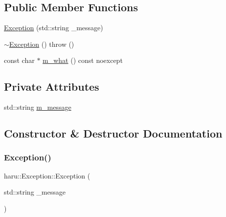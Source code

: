 \subsection*{Public Member Functions}
\begin{DoxyCompactItemize}
\item 
\mbox{\hyperlink{classharu_1_1_exception_a0bbb05d0c389c35b2917265a4d0fedfd}{Exception}} (std\+::string \+\_\+message)
\item 
\mbox{\hyperlink{classharu_1_1_exception_afcd6237b3d29ea8706f041a8d8f10ac9}{$\sim$\+Exception}} ()  throw ()
\item 
const char $\ast$ \mbox{\hyperlink{classharu_1_1_exception_a2b579cd90e5fcbf2894b903c3915550b}{m\+\_\+what}} () const noexcept
\end{DoxyCompactItemize}
\subsection*{Private Attributes}
\begin{DoxyCompactItemize}
\item 
std\+::string \mbox{\hyperlink{classharu_1_1_exception_a923972934d42b96a2af6f98668f757aa}{m\+\_\+message}}
\end{DoxyCompactItemize}


\subsection{Constructor \& Destructor Documentation}
\mbox{\label{classharu_1_1_exception_a0bbb05d0c389c35b2917265a4d0fedfd}} 
\subsubsection{\texorpdfstring{Exception()}{Exception()}}
{\footnotesize\ttfamily haru\+::\+Exception\+::\+Exception (\begin{DoxyParamCaption}\item[{std\+::string}]{\+\_\+message }\end{DoxyParamCaption})}

\mbox{\label{classharu_1_1_exception_afcd6237b3d29ea8706f041a8d8f10ac9}} 
